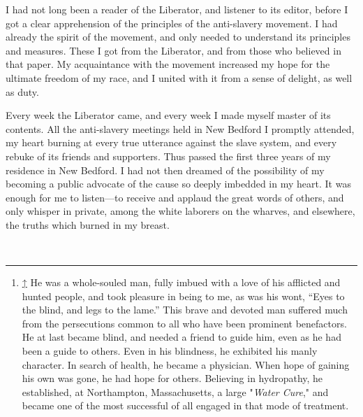 I had not long been a reader of the Liberator, and listener to its
editor, before I got a clear apprehension of the principles of the
anti-slavery movement. I had already the spirit of the movement, and
only needed to understand its principles and measures. These I got from
the Liberator, and from those who believed in that paper. My
acquaintance with the {}movement increased my hope for the ultimate
freedom of my race, and I united with it from a sense of delight, as
well as duty.

Every week the Liberator came, and every week I made myself master of
its contents. All the anti-slavery meetings held in New Bedford I
promptly attended, my heart burning at every true utterance against the
slave system, and every rebuke of its friends and supporters. Thus
passed the first three years of my residence in New Bedford. I had not
then dreamed of the possibility of my becoming a public advocate of the
cause so deeply imbedded in my heart. It was enough for me to
listen---to receive and applaud the great words of others, and only
whisper in private, among the white laborers on the wharves, and
elsewhere, the truths which burned in my breast.

~

\begin{center}\rule{0.5\linewidth}{\linethickness}\end{center}

\begin{enumerate}
\item
  \hypertarget{cite_note-1}{}

  {\protect\hyperlink{cite_ref-1}{↑}} {He was a whole-souled man, fully
  imbued with a love of his afflicted and hunted people, and took
  pleasure in being to me, as was his wont, ``Eyes to the blind, and
  legs to the lame.'' This brave and devoted man suffered much from the
  persecutions common to all who have been prominent benefactors. He at
  last became blind, and needed a friend to guide him, even as he had
  been a guide to others. Even in his blindness, he exhibited his manly
  character. In search of health, he became a physician. When hope of
  gaining his own was gone, he had hope for others. Believing in
  hydropathy, he established, at Northampton, Massachusetts, a large
  "\emph{Water Cure}," and became one of the most successful of all
  engaged in that mode of treatment.}
\end{enumerate}
